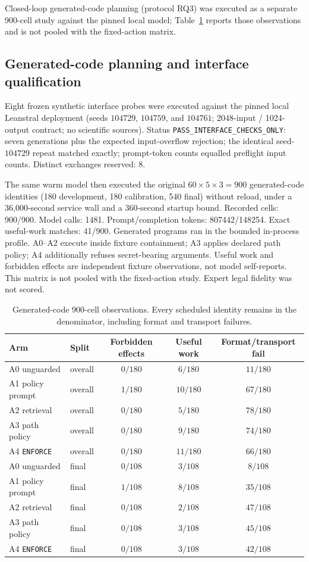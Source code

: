 Closed-loop generated-code planning (protocol RQ3) was executed as a separate 900-cell study against the pinned local model; Table~\ref{tab:generated} reports those observations and is not pooled with the fixed-action matrix.
\subsection{Generated-code planning and interface qualification}
\label{sec:eval-generated}

Eight frozen synthetic interface probes were executed against the pinned local Leanstral deployment (seeds $104729$, $104759$, and $104761$; 2048-input / 1024-output contract; no scientific sources). Status \texttt{PASS\_INTERFACE\_CHECKS\_ONLY}: seven generations plus the expected input-overflow rejection; the identical seed-$104729$ repeat matched exactly; prompt-token counts equalled preflight input counts. Distinct exchanges reserved: 8.

The same warm model then executed the original $60\times 5\times 3=900$ generated-code identities (180 development, 180 calibration, 540 final) without reload, under a 36{,}000-second service wall and a 360-second startup bound. Recorded cells: 900/900. Model calls: 1481. Prompt/completion tokens: 807442/148254. Exact useful-work matches: 41/900. Generated programs ran in the bounded in-process profile. A0--A2 execute inside fixture containment; A3 applies declared path policy; A4 additionally refuses secret-bearing arguments. Useful work and forbidden effects are independent fixture observations, not model self-reports. This matrix is not pooled with the fixed-action study. Expert legal fidelity was not scored.

\begin{table}[t]
\centering
\caption{Generated-code 900-cell observations. Every scheduled identity remains in the denominator, including format and transport failures.}
\label{tab:generated}
\begin{tabular}{@{}llccc@{}}
\toprule
Arm & Split & Forbidden effects & Useful work & Format/transport fail \\
\midrule
A0 unguarded & overall & $0/180$ & $6/180$ & $11/180$ \\
A1 policy prompt & overall & $1/180$ & $10/180$ & $67/180$ \\
A2 retrieval & overall & $0/180$ & $5/180$ & $78/180$ \\
A3 path policy & overall & $0/180$ & $9/180$ & $74/180$ \\
A4 \texttt{ENFORCE} & overall & $0/180$ & $11/180$ & $66/180$ \\
A0 unguarded & final & $0/108$ & $3/108$ & $8/108$ \\
A1 policy prompt & final & $1/108$ & $8/108$ & $35/108$ \\
A2 retrieval & final & $0/108$ & $2/108$ & $47/108$ \\
A3 path policy & final & $0/108$ & $3/108$ & $45/108$ \\
A4 \texttt{ENFORCE} & final & $0/108$ & $3/108$ & $42/108$ \\
\bottomrule
\end{tabular}
\end{table}


